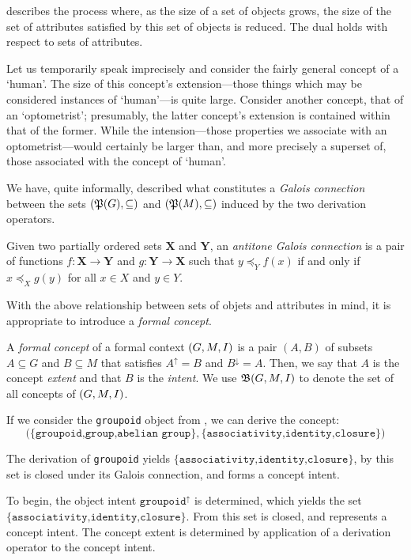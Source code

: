  describes the process where, as the size of a set of objects grows, the size of the set of attributes satisfied by this set of objects is reduced. The dual holds with respect to sets of attributes.

Let us temporarily speak imprecisely and consider the fairly general concept of a `human'. The size of this concept's extension---those things which may be considered instances of `human'---is quite large. Consider another concept, that of an `optometrist'; presumably, the latter concept's extension is contained within that of the former. While the intension---those properties we associate with an optometrist---would certainly be larger than, and more precisely a superset of, those associated with the concept of `human'.

We have, quite informally, described what constitutes a \textit{Galois connection} between the sets $(\mathfrak{P}({G}), \subseteq)$ and $(\mathfrak{P}({M}), \subseteq)$ induced by the two derivation operators.

\begin{definition}
  \label{definition:galois-connection} 
  Given two partially ordered sets $\mathbf{X}$ and $\mathbf{Y}$, an \textit{antitone Galois connection} is a pair of functions $f:\mathbf{X}\!\to\!\mathbf{Y}$ and $g:\mathbf{Y}\!\to\!\mathbf{X}$ such that $y \preceq_Y f(x)$ if and only if $x \preceq_X g(y)$ for all $x\in X$ and $y\in Y$.
\end{definition}

With the above relationship between sets of objets and attributes in mind, it is appropriate to introduce a \textit{formal concept}.

\begin{definition}
  \label{definition:formal-concept} 
  A \textit{formal concept} of a formal context $(G,M,\mathrel{I})$  is a pair $(A,B)$ of subsets $A \subseteq G$ and $B \subseteq M$ that satisfies $A^\uparrow = B$ and $B^\downarrow = A$. Then, we say that $A$ is the concept \textit{extent} and that $B$ is the \textit{intent}. We use ${\mathfrak B} (G,M,\mathrel{I})$ to denote the set of all concepts of $(G,M,\mathrel{I})$.
\end{definition}

\begin{example}
\label{example:formal-concept}
If we consider the \texttt{groupoid} object from , we can derive the concept:
%
\[\big(\{\texttt{groupoid,group,abelian group}\}, \{\texttt{associativity,identity,closure}\} \big)\]

The derivation of \texttt{groupoid} yields $\{\texttt{associativity,identity,closure}\}$, by  this set is closed under its Galois connection, and forms a concept intent.

To begin, the object intent $\texttt{groupoid}^\uparrow$ is determined, which yields the set $\{\texttt{associativity,identity,closure}\}$. From  this set is closed, and represents a concept intent. The concept extent is determined by application of a derivation operator to the concept intent.
\end{example}

